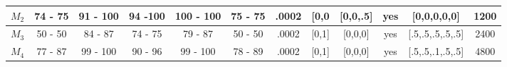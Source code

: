 \begin{table}[H]
{\begin{tabular}{|c|c|c|c|c|c|c|c|c|c|c|c|}
\rowcolor[HTML]{FFFFFF} 
$M_{2}$                                                                              & 74 - 75                                 & 91 - 100                                & 94 -100                                 & 100 - 100                               & 75 - 75                                 & .0002                                                                                   & {[}0,0                                                                                      & {[}0,0,.5{]}                                                                                & yes                                                                                       & {[}0,0,0,0,0{]}                                                                         & 1200                                                                                      \\ \hline
\rowcolor[HTML]{FFFFFF} 
$M_{3}$                                                                              & 50 - 50                                 & 84 - 87                                 & 74 - 75                                 & 79 - 87                                 & 50 - 50                                 & .0002                                                                                   & {[}0,1{]}                                                                                   & {[}0,0,0{]}                                                                                 & yes                                                                                       & {[}.5,.5,.5,.5,.5{]}                                                                    & 2400                                                                                      \\ \hline
\rowcolor[HTML]{FFFFFF} 
$M_{4}$                                                                              & 77 - 87                                 & 99 - 100                                & 90 - 96                                 & 99 - 100                                & 78 - 89                                 & .0002                                                                                   & {[}0,1{]}                                                                                   & {[}0,0,0{]}                                                                                 & yes                                                                                       & {[}.5,.5,.1,.5,.5{]}                                                                    & 4800                                                                                      \\ \hline

\end{tabular}}
\end{table}
